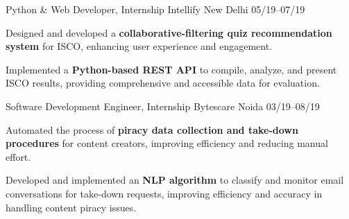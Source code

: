 \begin{cventries}
  \cventry
    {Python \& Web Developer, Internship} %
    {Intellify} %
    {New Delhi} %
    {05/19--07/19} %
    {
      \begin{cvitems} %
        \item {Designed and developed a \textbf{collaborative-filtering quiz recommendation system} for ISCO, enhancing user experience and engagement.}
        \item {Implemented a \textbf{Python-based REST API} to compile, analyze, and present ISCO results, providing comprehensive and accessible data for evaluation.}
      \end{cvitems}
    }
    {}

\cventry
    {Software Development Engineer, Internship} %
    {Bytescare} %
    {Noida} %
    {03/19--08/19} %
    {
      \begin{cvitems} %
        \item {Automated the process of \textbf{piracy data collection and take-down procedures} for content creators, improving efficiency and reducing manual effort.}
        \item {Developed and implemented an \textbf{NLP algorithm} to classify and monitor email conversations for take-down requests, improving efficiency and accuracy in handling content piracy issues.}
      \end{cvitems}
    }
    {}

\end{cventries}
